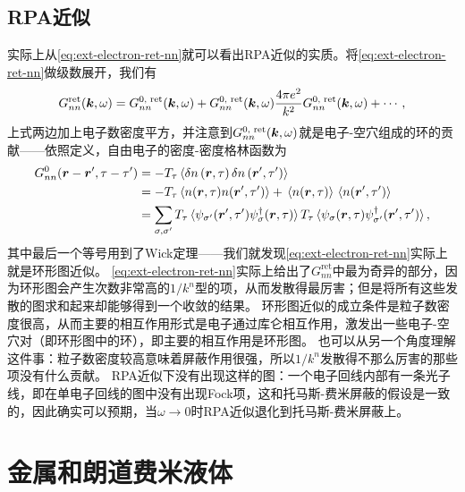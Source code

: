 \subsection{RPA近似}

实际上从\eqref{eq:ext-electron-ret-nn}就可以看出RPA近似的实质。将\eqref{eq:ext-electron-ret-nn}做级数展开，我们有
\[
    G^\text{ret}_{nn}(\vb*{k}, \omega) = G^\text{0, ret}_{nn}(\vb*{k}, \omega) + G^\text{0, ret}_{nn}(\vb*{k}, \omega) \frac{4\pi e^2}{k^2} G^\text{0, ret}_{nn}(\vb*{k}, \omega) + \cdots,
\]
上式两边加上电子数密度平方，并注意到$G^\text{0, ret}_{nn}(\vb*{k}, \omega)$就是电子-空穴组成的环的贡献——依照定义，自由电子的密度-密度格林函数为
\[
    \begin{aligned}
        G_{nn}^\text{0}(\vb*{r}-\vb*{r}', \tau-\tau') &= - T_\tau \expval*{\var{{n}}(\vb*{r}, \tau) \var{{n}}(\vb*{r}', \tau')} \\
        &= - T_\tau \expval*{{{n}}(\vb*{r}, \tau) {{n}}(\vb*{r}', \tau')} + \expval*{{n}(\vb*{r}, \tau)} \expval*{{n}(\vb*{r}', \tau')} \\
        &= \sum_{\sigma, \sigma'} T_\tau \expval*{{\psi}_{\sigma'}(\vb*{r}', \tau') {\psi}^\dagger_\sigma(\vb*{r}, \tau)} T_\tau \expval*{ {\psi}_\sigma(\vb*{r}, \tau) {\psi}^\dagger_{\sigma'}(\vb*{r}', \tau') } ,
    \end{aligned}
\]
其中最后一个等号用到了Wick定理——我们就发现\eqref{eq:ext-electron-ret-nn}实际上就是环形图近似。
\eqref{eq:ext-electron-ret-nn}实际上给出了$G^\text{ret}_{nn}$中最为奇异的部分，因为环形图会产生次数非常高的$1/k^n$型的项，从而发散得最厉害；但是将所有这些发散的图求和起来却能够得到一个收敛的结果。
环形图近似的成立条件是粒子数密度很高，从而主要的相互作用形式是电子通过库仑相互作用，激发出一些电子-空穴对（即环形图中的环），即主要的相互作用是环形图。
也可以从另一个角度理解这件事：粒子数密度较高意味着屏蔽作用很强，所以$1/k^n$发散得不那么厉害的那些项没有什么贡献。
RPA近似下没有出现这样的图：一个电子回线内部有一条光子线，即在单电子回线的图中没有出现Fock项，这和托马斯-费米屏蔽的假设是一致的，因此确实可以预期，当$\omega \to 0$时RPA近似退化到托马斯-费米屏蔽上。

\section{金属和朗道费米液体}\label{sec:landau-fermi-liquid}

